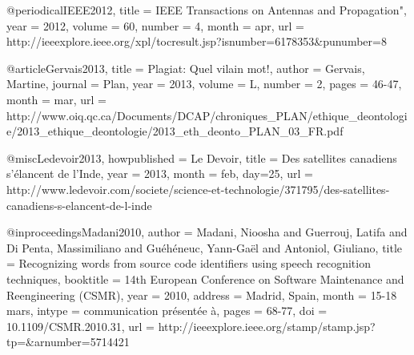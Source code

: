@periodical{IEEE2012,
title = {{IEEE} Transactions on Antennas and Propagation"},
year = {2012},
volume = {60},
number = {4},
month = apr,
url = {http://ieeexplore.ieee.org/xpl/tocresult.jsp?isnumber=6178353&punumber=8}
}




@article{Gervais2013,
title = {Plagiat: Quel vilain mot!},
author = {Gervais, Martine},
journal = {Plan},
year = {2013},
volume = {L},
number = {2},
pages = {46-47},
month = mar,
url = {http://www.oiq.qc.ca/Documents/DCAP/chroniques_PLAN/ethique_deontologie/2013_ethique_deontologie/2013_eth_deonto_PLAN_03_FR.pdf}
}




@misc{Ledevoir2013,
howpublished = {Le Devoir},
title = {Des satellites canadiens s'élancent de l'{I}nde},
year = {2013},
month = feb,
day={25},
url = {http://www.ledevoir.com/societe/science-et-technologie/371795/des-satellites-canadiens-s-elancent-de-l-inde}
}




@inproceedings{Madani2010,
author = {Madani, Nioosha and Guerrouj, Latifa and Di Penta, Massimiliano and Guéhéneuc, Yann-Gaël and Antoniol, Giuliano},
title = {Recognizing words from source code identifiers using speech recognition techniques},
booktitle = {14th European Conference on Software Maintenance and Reengineering ({CSMR})},
year = {2010},
address = {Madrid, Spain},
month = {15-18 mars},		
intype = {communication présentée à},		
pages = {68-77},
doi = {10.1109/CSMR.2010.31},
url = {http://ieeexplore.ieee.org/stamp/stamp.jsp?tp=&arnumber=5714421}
}





